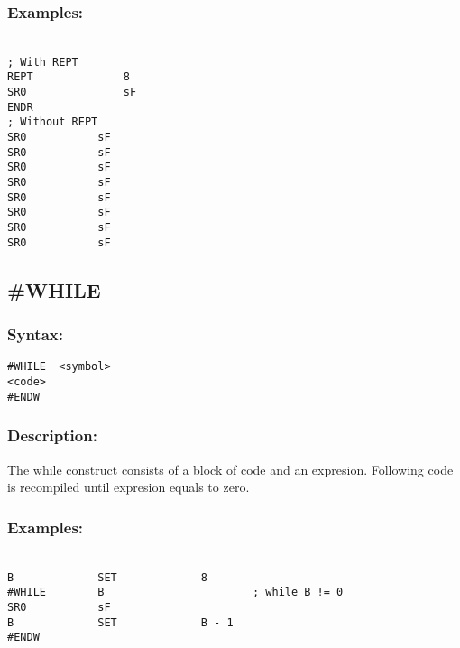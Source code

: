 {        \subsubsection{Examples:}
        {
            ~\\
            \usecodefont
                \verb'; With REPT'\\
                \verb'REPT              8'\\
                \verb'SR0               sF'\\
                \verb'ENDR'\\
                \verb'; Without REPT'\\
                \verb'SR0           sF'\\
                \verb'SR0           sF'\\
                \verb'SR0           sF'\\
                \verb'SR0           sF'\\
                \verb'SR0           sF'\\
                \verb'SR0           sF'\\
                \verb'SR0           sF'\\
                \verb'SR0           sF'\\
        }        
    \subsection{\#WHILE}
        \subsubsection{Syntax:}
            \verb'#WHILE  <symbol>'\\
            \verb'<code>'\\
            \verb'#ENDW'
            
        \subsubsection{Description:}
        The while construct consists of a block of code and an expresion. Following code is recompiled until expresion equals to zero.

        \subsubsection{Examples:}
            {
                ~\\
                \usecodefont
                \verb'B             SET             8'\\
                \verb'#WHILE        B                       ; while B != 0'\\
                \verb'SR0           sF'\\
                \verb'B             SET             B - 1'\\
                \verb'#ENDW'
    }
}

